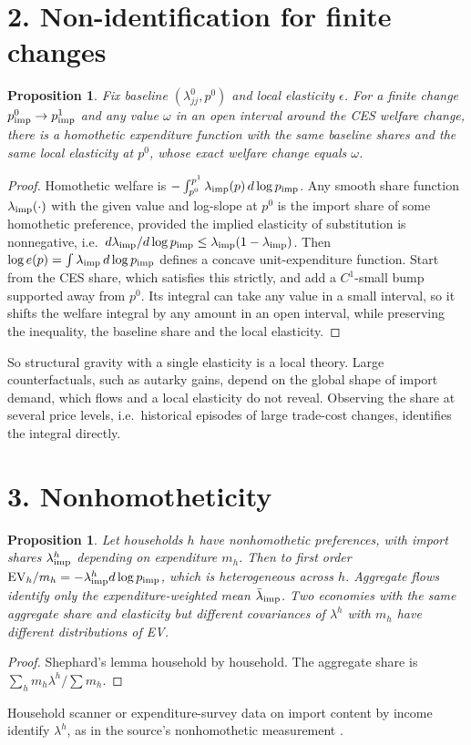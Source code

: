 \documentclass[11pt]{article}
\newtheorem{proposition}[theorem]{Proposition}
\theoremstyle{definition}
\begin{document}
\section*{2. Non-identification for finite changes}
\begin{proposition}\label{prop:oe}
Fix baseline $(\lambda_{jj}^0,p^0)$ and local elasticity $\epsilon$. For a finite change $p_{\rm imp}^0\to p^1_{\rm imp}$ and
any value $\omega$ in an open interval around the CES welfare change, there is a homothetic expenditure function with the
same baseline shares and the same local elasticity at $p^0$, whose exact welfare change equals $\omega$.
\end{proposition}
\begin{proof}
Homothetic welfare is $-\int_{p^0}^{p^1}\lambda_{\rm imp}(p)\,d\log p_{\rm imp}$. Any smooth share function $\lambda_{\rm imp}(\cdot)$
with the given value and log-slope at $p^0$ is the import share of some homothetic preference, provided the implied
elasticity of substitution is nonnegative, i.e.\ $d\lambda_{\rm imp}/d\log p_{\rm imp}\le\lambda_{\rm imp}(1-\lambda_{\rm imp})$.
Then $\log e(p)=\int\lambda_{\rm imp}\,d\log p_{\rm imp}$ defines a concave unit-expenditure function. Start from the CES share,
which satisfies this strictly, and add a $C^1$-small bump supported away from $p^0$. Its integral can take any value in a small
interval, so it shifts the welfare integral by any amount in an open interval, while preserving the inequality, the baseline
share and the local elasticity.
\end{proof}
So structural gravity with a single elasticity is a local theory. Large counterfactuals, such as autarky gains, depend on the
global shape of import demand, which flows and a local elasticity do not reveal. Observing the share at several
price levels, i.e.\ historical episodes of large trade-cost changes, identifies the integral directly.

\section*{3. Nonhomotheticity}
\begin{proposition}\label{prop:nh}
Let households $h$ have nonhomothetic preferences, with import shares $\lambda^h_{\rm imp}$ depending on expenditure $m_h$.
Then to first order $\mathrm{EV}_h/m_h=-\lambda^h_{\rm imp}d\log p_{\rm imp}$, which is heterogeneous across $h$. Aggregate
flows identify only the expenditure-weighted mean $\bar\lambda_{\rm imp}$. Two economies with the same aggregate share and
elasticity but different covariances of $\lambda^h$ with $m_h$ have different distributions of EV.
\end{proposition}
\begin{proof}
Shephard's lemma household by household. The aggregate share is $\sum_hm_h\lambda^h/\sum m_h$.
\end{proof}
Household scanner or expenditure-survey data on import content by income identify $\lambda^h$, as in the source's
nonhomothetic measurement \cite{fk}.
\end{document}
